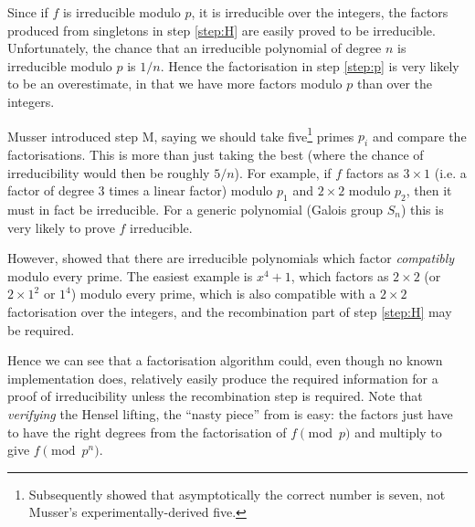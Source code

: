 \documentclass{llncs}
\begin{document}
Since if $f$ is irreducible modulo $p$, it is irreducible over the integers, the factors produced from singletons in step \ref{step:H} are easily proved to be irreducible.  Unfortunately, the chance that an irreducible polynomial of degree $n$ is irreducible modulo $p$ is $1/n$. Hence the factorisation in step \ref{step:p} is very likely to be an overestimate, in that we have more factors modulo $p$ than over the integers.
\par
Musser introduced step M, saying we should take five\footnote{Subsequently \cite{LuczakPyber1997} showed that asymptotically the correct number is seven, not Musser's experimentally-derived five.} primes $p_i$ and compare the factorisations. This is more than just taking the best (where the chance of irreducibility would then be roughly $5/n$). For example, if $f$ factors as $3\times 1$ (i.e. a factor of degree 3 times a linear factor) modulo $p_1$ and $2\times 2$ modulo $p_2$, then it must in fact be irreducible. For a generic polynomial (Galois group $S_n$) this is very likely to prove $f$ irreducible.
\par
However, \cite{SwinnertonDyer1969} showed that there are irreducible polynomials which factor \emph{compatibly} modulo every prime. The easiest example is $x^4+1$, which factors as $2\times 2$ (or $2\times 1^2$ or $1^4$) modulo every prime, which is also compatible with a $2\times 2$ factorisation over the integers, and the recombination part of step \ref{step:H} may be required.
\par
Hence we can see that a factorisation algorithm could, even though no known implementation does, relatively easily produce the required information for a proof of irreducibility unless the recombination step is required. Note that \emph{verifying} the Hensel lifting, the ``nasty piece'' from \cite{MooreNorman1981} is easy: the factors just have to have the right degrees from the factorisation of $f \pmod p$ and multiply to give $f\pmod{p^n}$.
\iffalse
\end{document}
